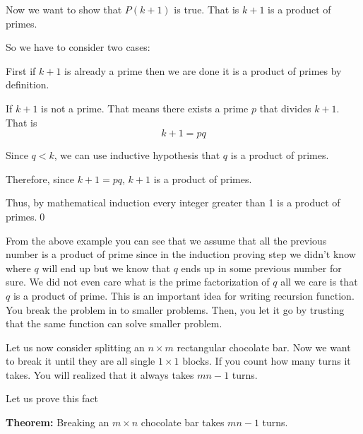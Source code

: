 \documentclass[a4paper, 12pt]{article}
\newcommand{\theorem}{\noindent\textbf{Theorem:} }
\newcommand{\qedd}{\qed\newline}
\theoremstyle{examplestyle}
\begin{document}
\begin{multicols}{2}
Now we want to show that $P(k+1)$ is true. That is $k+1$ is a product of primes.

So we have to consider two cases:

First if $k+1$ is already a prime then we are done it is a product of primes by definition.

If $k+1$ is not a prime. That means there exists a prime $p$ that divides $k+1$. That is
\[
	k+1 = p q
\]

Since $q < k$, we can use inductive hypothesis that $q$ is a product of primes.

Therefore, since $k+1 = pq$, $k+1$ is a product of primes. 

Thus, by mathematical induction every integer greater than 1 is a product of primes.\qedd

From the above example you can see that we assume that all the previous number is a product of prime since in the induction proving step we didn't know where $q$ will end up but we know that $q$ ends up in some previous number for sure. We did not even care what is the prime factorization of $q$ all we care is that $q$ is a product of prime. This is an important idea for writing recursion function. You break the problem in to smaller problems. Then, you let it go by trusting that the same function can solve smaller problem.

Let us now consider splitting an $n\times m$ rectangular chocolate bar. Now we want to break it until they are all single $1\times 1$ blocks. If you count how many turns it takes. You will realized that it always takes $mn-1$ turns.
\begin{center}
\end{center}

Let us prove this fact

\theorem Breaking an $m\times n$ chocolate bar takes $mn-1$ turns.


\end{multicols}
\end{document}
